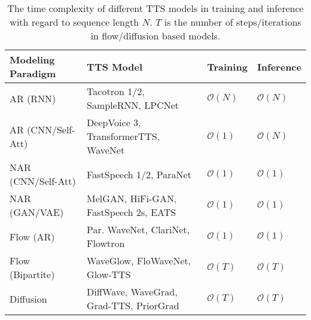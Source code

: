 \documentclass{article}
\begin{document}
\begin{table}[h]
\small
	\caption{The time complexity of different TTS models in training and inference with regard to sequence length $N$. $T$ is the number of steps/iterations in flow/diffusion based models. }
	\centering
	\begin{tabular}{l l  l  l }
		\toprule
		Modeling Paradigm & TTS Model & Training &  Inference  \\
		\midrule
		AR (RNN) & Tacotron 1/2, SampleRNN, LPCNet & $\mathcal{O}(N)$ & $\mathcal{O}(N)$ \\
		AR (CNN/Self-Att) & DeepVoice 3, TransformerTTS, WaveNet & $\mathcal{O}(1)$ & $\mathcal{O}(N)$ \\
		NAR (CNN/Self-Att) & FastSpeech 1/2, ParaNet & $\mathcal{O}(1)$ & $\mathcal{O}(1)$  \\
		NAR (GAN/VAE) & MelGAN, HiFi-GAN, FastSpeech 2s, EATS & $\mathcal{O}(1)$ & $\mathcal{O}(1)$ \\
		Flow (AR)  & Par. WaveNet, ClariNet, Flowtron & $\mathcal{O}(1)$ & $\mathcal{O}(1)$  \\
		Flow (Bipartite) & WaveGlow, FloWaveNet, Glow-TTS  & $\mathcal{O}(T)$ & $\mathcal{O}(T)$ \\
		Diffusion & DiffWave, WaveGrad, Grad-TTS, PriorGrad  & $\mathcal{O}(T)$ & $\mathcal{O}(T)$ \\
		\bottomrule
	\end{tabular}
	\label{tab_time_complexity}
\end{table}
\end{document}
